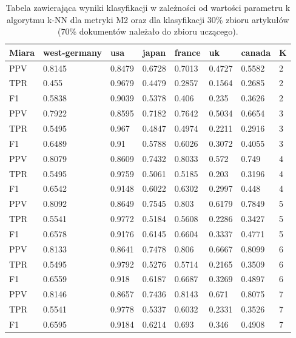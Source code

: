 \documentclass{classrep}
\begin{document}
\begin{table}[H]
    \centering
\caption{Tabela zawierająca wyniki klasyfikacji w zależności od wartości parametru k algorytmu k-NN dla metryki M2 oraz dla klasyfikacji 30\% zbioru artykułów (70\% dokumentów należało do zbioru uczącego).}
\begin{adjustbox}{max width=\textwidth}
    \begin{tabular}{|l|l|l|l|l|l|l|l|}
    \hline
        Miara & west-germany  & usa  & japan & france & uk & canada & K \\ \hline
        PPV & 0.8145 & 0.8479 & 0.6728 & 0.7013 & 0.4727 & 0.5582 & 2 \\ \hline
        TPR & 0.455 & 0.9679 & 0.4479 & 0.2857 & 0.1564 & 0.2685 & 2 \\ \hline
        F1 & 0.5838 & 0.9039 & 0.5378 & 0.406 & 0.235 & 0.3626 & 2 \\ \hline
        PPV & 0.7922 & 0.8595 & 0.7182 & 0.7642 & 0.5034 & 0.6654 & 3 \\ \hline
        TPR & 0.5495 & 0.967 & 0.4847 & 0.4974 & 0.2211 & 0.2916 & 3 \\ \hline
        F1 & 0.6489 & 0.91 & 0.5788 & 0.6026 & 0.3072 & 0.4055 & 3 \\ \hline
        PPV & 0.8079 & 0.8609 & 0.7432 & 0.8033 & 0.572 & 0.749 & 4 \\ \hline
        TPR & 0.5495 & 0.9759 & 0.5061 & 0.5185 & 0.203 & 0.3196 & 4 \\ \hline
        F1 & 0.6542 & 0.9148 & 0.6022 & 0.6302 & 0.2997 & 0.448 & 4 \\ \hline
        PPV & 0.8092 & 0.8649 & 0.7545 & 0.803 & 0.6179 & 0.7849 & 5 \\ \hline
        TPR & 0.5541 & 0.9772 & 0.5184 & 0.5608 & 0.2286 & 0.3427 & 5 \\ \hline
        F1 & 0.6578 & 0.9176 & 0.6145 & 0.6604 & 0.3337 & 0.4771 & 5 \\ \hline
        PPV & 0.8133 & 0.8641 & 0.7478 & 0.806 & 0.6667 & 0.8099 & 6 \\ \hline
        TPR & 0.5495 & 0.9792 & 0.5276 & 0.5714 & 0.2165 & 0.3509 & 6 \\ \hline
        F1 & 0.6559 & 0.918 & 0.6187 & 0.6687 & 0.3269 & 0.4897 & 6 \\ \hline
        PPV & 0.8146 & 0.8657 & 0.7436 & 0.8143 & 0.671 & 0.8075 & 7 \\ \hline
        TPR & 0.5541 & 0.9778 & 0.5337 & 0.6032 & 0.2331 & 0.3526 & 7 \\ \hline
        F1 & 0.6595 & 0.9184 & 0.6214 & 0.693 & 0.346 & 0.4908 & 7 \\ \hline

\end{tabular}
\end{adjustbox}
\end{table}
\end{document}
